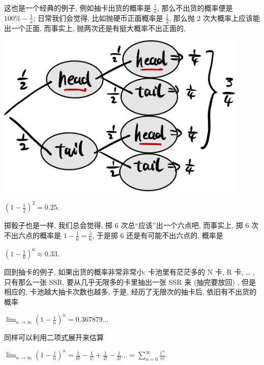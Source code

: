 \begin{tcolorbox}[size=fbox, breakable, enhanced jigsaw, title={抽卡}]

这也是一个经典的例子, 例如抽卡出货的概率是 $\frac{1}{x}$,
那么不出货的概率便是 $100\%-\frac{1}{x}$; 日常我们会觉得,
比如抛硬币正面概率是 $\frac{1}{2}$, 那么抛 $2$
次大概率上应该能出一个正面, 而事实上, 抛两次还是有挺大概率不出正面的,

\begin{tcolorbox}[size=fbox, breakable, enhanced jigsaw, sidebyside]
\includegraphics[width=0.9\textwidth]{img/image-20230410164701991.png}
\tcblower
{}
\end{tcolorbox}

$\left (1-\frac{1}{2}\right)^2=0.25.$

掷骰子也是一样, 我们总会觉得, 掷 $6$ 次总``应该''出一个六点吧,
而事实上, 掷 $6$ 次不出六点的概率是 $1-\frac{1}{6}=\frac{5}{6}$, 于是掷 $6$
还是有可能不出六点的, 概率是

$\left (1-\frac{1}{6}\right)^6\approx0.33.$

回到抽卡的例子, 如果出货的概率非常非常小: 卡池里有茫茫多的 N 卡, R 卡,
\ldots{} , 只有那么一张 SSR, 要从几乎无限多的卡里抽出一张 SSR 来
(抽完要放回) , 但是相应的, 卡池越大抽卡次数也越多, 于是,
经历了无限次的抽卡后, 依旧有不出货的概率

$\lim_{n\rightarrow\infty}\left (1-\frac{1}{n}\right)^n=0.367879...$

同样可以利用二项式展开来估算

$\lim_{n\rightarrow\infty}\left (1-\frac{1}{n}\right)^n=\frac{1}{0!}-\frac{1}{1!}+\frac{1}{2!}-\frac{1}{3!}...=\sum_{n=0}^\infty\frac{1^{n}}{n!}.$


\end{tcolorbox}
